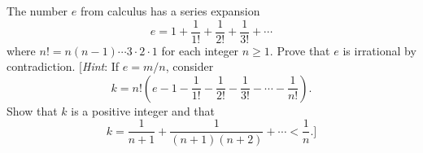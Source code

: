 \begin{multicols}{2}
\begin{ex}
\begin{sol}
\begin{enumerate}[label={\alph*.}]
\end{enumerate}
\end{sol}
\end{ex}

\begin{ex}
The number $e$ from calculus has a series expansion
\begin{equation*}
e = 1 + \frac{1}{1!} + \frac{1}{2!} + \frac{1}{3!} + \cdots
\end{equation*}
where $n! = n(n - 1) \cdots  3 \cdot 2 \cdot 1$ for each integer $n \geq 1$. Prove that $e$ is irrational by contradiction. [\textit{Hint}: If $e = m/n$, consider
\begin{equation*}
k = n! \left(e- 1 - \frac{1}{1!} - \frac{1}{2!} - \frac{1}{3!} - \cdots - \frac{1}{n!} \right).
\end{equation*}
Show that $k$ is a positive integer and that
\begin{equation*}
k = \frac{1}{n+1} + \frac{1}{(n+1)(n+2)} + \cdots < \frac{1}{n}. ]
\end{equation*}
\end{ex}

\end{multicols}


